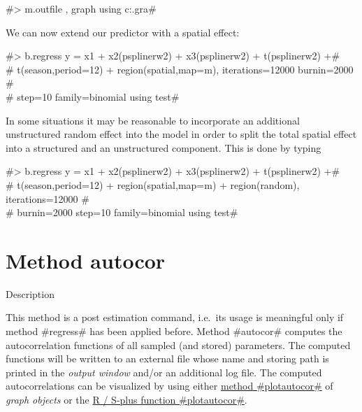 #> m.outfile , graph using c:\maps\mapgraph.gra#

We can now extend our predictor with a spatial effect:

#> b.regress y = x1 + x2(psplinerw2) + x3(psplinerw2) + t(psplinerw2) +# \\
#  t(season,period=12) + region(spatial,map=m), iterations=12000 burnin=2000 #\\
#  step=10 family=binomial using test#

In some situations it may be reasonable to incorporate  an
additional unstructured  random effect into the model in order to
split the total spatial effect into a structured and an
unstructured component. This is done by typing

#> b.regress y = x1 + x2(psplinerw2) + x3(psplinerw2) + t(psplinerw2) +# \\
#  t(season,period=12) + region(spatial,map=m) + region(random), iterations=12000 #\\
#  burnin=2000 step=10 family=binomial using test#

\section{Method autocor}
\label{bayesautocorr} 
 

\begin{stanza}{Description}

This method is a post estimation command, i.e.~its usage is
meaningful only if method #regress# has been applied before. Method
#autocor# computes the autocorrelation functions of all sampled (and
stored) parameters. The computed functions will be written to an
external file whose name and storing path is printed in the {\em
output window} and/or an additional log file. The computed
autocorrelations can be visualized by using either
\hyperref[graphplotautocor]{method #plotautocor#} of {\em graph
objects} or the \hyperref[splusplotautocor]{R / S-plus function
#plotautocor#}.
\end{stanza}

